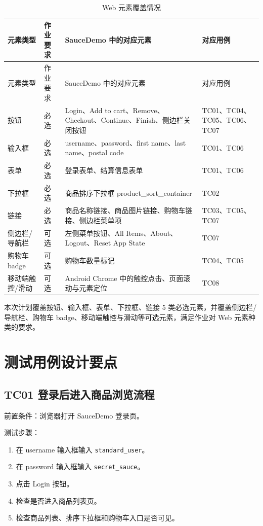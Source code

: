 \documentclass[UTF8,a4paper,12pt]{ctexart}
\begin{document}
\begingroup
\small
\setlength{\tabcolsep}{2pt}
\begin{longtable}{p{2.0cm}p{1.4cm}p{6.0cm}p{3.8cm}}
\caption{Web 元素覆盖情况}\\
\toprule
元素类型 & 作业要求 & SauceDemo 中的对应元素 & 对应用例 \\
\midrule
\endfirsthead
\toprule
元素类型 & 作业要求 & SauceDemo 中的对应元素 & 对应用例 \\
\midrule
\endhead
按钮 & 必选 & Login、Add to cart、Remove、Checkout、Continue、Finish、侧边栏关闭按钮 & TC01、TC04、TC05、TC06、TC07 \\
输入框 & 必选 & username、password、first name、last name、postal code & TC01、TC06 \\
表单 & 必选 & 登录表单、结算信息表单 & TC01、TC06 \\
下拉框 & 必选 & 商品排序下拉框 product\_sort\_container & TC02 \\
链接 & 必选 & 商品名称链接、商品图片链接、购物车链接、侧边栏菜单项 & TC03、TC05、TC07 \\
侧边栏/导航栏 & 可选 & 左侧菜单按钮、All Items、About、Logout、Reset App State & TC07 \\
购物车 badge & 可选 & 购物车数量标记 & TC04、TC05 \\
移动端触控/滑动 & 可选 & Android Chrome 中的触控点击、页面滚动与元素定位 & TC08 \\
\bottomrule
\end{longtable}
\endgroup

本次计划覆盖按钮、输入框、表单、下拉框、链接 5 类必选元素，并覆盖侧边栏/导航栏、购物车 badge、移动端触控与滑动等可选元素，满足作业对 Web 元素种类的要求。

\section{测试用例设计要点}

\subsection{TC01 登录后进入商品浏览流程}

前置条件：浏览器打开 SauceDemo 登录页。

测试步骤：

\begin{enumerate}
  \item 在 username 输入框输入 \texttt{standard\_user}。
  \item 在 password 输入框输入 \texttt{secret\_sauce}。
  \item 点击 Login 按钮。
  \item 检查是否进入商品列表页。
  \item 检查商品列表、排序下拉框和购物车入口是否可见。
\end{enumerate}
\end{document}

